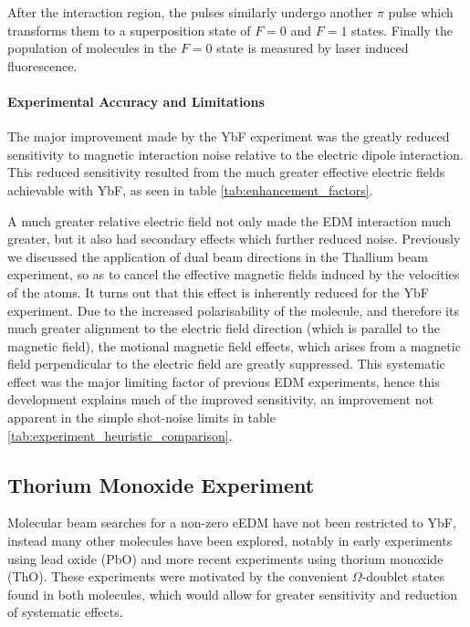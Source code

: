 After the interaction region, the pulses similarly undergo another $\pi$ pulse which transforms them to a superposition state of $F=0$ and $F=1$ states. Finally the population of molecules in the $F=0$ state is measured by laser induced fluorescence.

\paragraph{Experimental Accuracy and Limitations}

The major improvement made by the YbF experiment was the greatly reduced sensitivity to magnetic interaction noise relative to the electric dipole interaction. This reduced sensitivity resulted from the much greater effective electric fields achievable with YbF, as seen in table \ref{tab:enhancement_factors}.

A much greater relative electric field not only made the EDM interaction much greater, but it also had secondary effects which further reduced noise. Previously we discussed the application of dual beam directions in the Thallium beam experiment, so as to cancel the effective magnetic fields induced by the velocities of the atoms. It turns out that this effect is inherently reduced for the YbF experiment. Due to the increased polarisability of the molecule, and therefore its much greater alignment to the electric field direction (which is parallel to the magnetic field), the motional magnetic field effects, which arises from a magnetic field perpendicular to the electric field are greatly suppressed. This systematic effect was the major limiting factor of previous EDM experiments, hence this development explains much of the improved sensitivity, an improvement not apparent in the simple shot-noise limits in table \ref{tab:experiment_heuristic_comparison}.

\subsection{Thorium Monoxide Experiment}
\label{ThO_Experiment}

Molecular beam searches for a non-zero eEDM have not been restricted to YbF, instead many other molecules have been explored, notably in early experiments using lead oxide (PbO) and more recent experiments using thorium monoxide (ThO). These experiments were motivated by the convenient $\Omega$-doublet states found in both molecules, which would allow for greater sensitivity and reduction of systematic effects.

